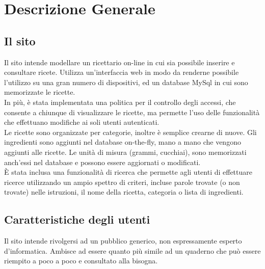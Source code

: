 \section{Descrizione Generale}{
	\subsection{Il sito}{
		Il sito intende modellare un ricettario on-line in cui sia possibile inserire e consultare ricete. Utilizza un'interfaccia web in modo da renderne possibile l'utilizzo su una gran numero di dispositivi, ed un database MySql in cui sono memorizzate le ricette.
		\\
		In più, è stata implementata una politica per il controllo degli accessi, che consente a chiunque di visualizzare le ricette, ma permette l'uso delle funzionalità che effettuano modifiche ai soli utenti autenticati.
		\\
		Le ricette sono organizzate per categorie, inoltre è semplice crearne di nuove. Gli ingredienti sono aggiunti nel database on-the-fly, mano a mano che vengono aggiunti alle ricette. Le unità di misura (grammi, cucchiai), sono memorizzati anch'essi nel database e possono essere aggiornati o modificati.
		\\
		È stata inclusa una funzionalità di ricerca che permette agli utenti di effettuare ricerce utilizzando un ampio spettro di criteri, incluse parole trovate (o non trovate) nelle istruzioni, il nome della ricetta, categoria o lista di ingredienti.

	}
	\subsection{Caratteristiche degli utenti}{
		Il sito intende rivolgersi ad un pubblico generico, non espressamente esperto d'informatica. 
		Ambisce ad essere quanto più simile ad un quaderno che può essere riempito a poco a poco e consultato alla bisogna.

	}
}
